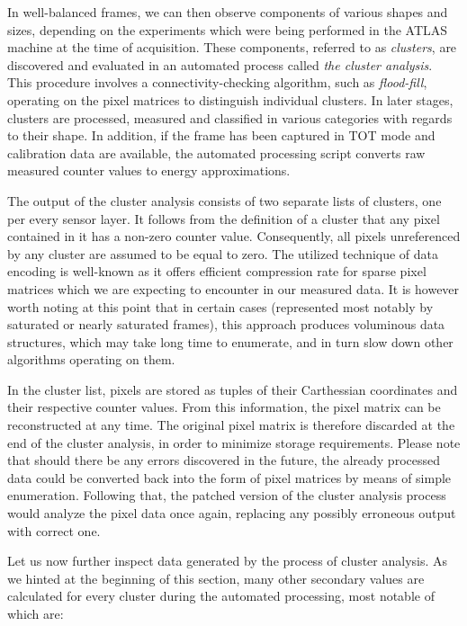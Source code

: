 In well-balanced frames, we can then observe components of various shapes and sizes, depending on the experiments which were being performed in the ATLAS machine at the time of acquisition. These components, referred to as \textit{clusters}, are discovered and evaluated in an automated process called \textit{the cluster analysis}. This procedure involves a connectivity-checking algorithm, such as \textit{flood-fill}, operating on the pixel matrices to distinguish individual clusters. In later stages, clusters are processed, measured and classified in various categories with regards to their shape. In addition, if the frame has been captured in TOT mode and calibration data are available, the automated processing script converts raw measured counter values to energy approximations.


The output of the cluster analysis consists of two separate lists of clusters, one per every sensor layer. It follows from the definition of a cluster that any pixel contained in it has a non-zero counter value. Consequently, all pixels unreferenced by any cluster are assumed to be equal to zero. The utilized technique of data encoding is well-known as it offers efficient compression rate for sparse pixel matrices which we are expecting to encounter in our measured data. It is however worth noting at this point that in certain cases (represented most notably by saturated or nearly saturated frames), this approach produces voluminous data structures, which may take long time to enumerate, and in turn slow down other algorithms operating on them.

In the cluster list, pixels are stored as tuples of their Carthessian coordinates and their respective counter values. From this information, the pixel matrix can be reconstructed at any time. The original pixel matrix is therefore discarded at the end of the cluster analysis, in order to minimize storage requirements. Please note that should there be any errors discovered in the future, the already processed data could be converted back into the form of pixel matrices by means of simple enumeration. Following that, the patched version of the cluster analysis process would analyze the pixel data once again, replacing any possibly erroneous output with correct one.

Let us now further inspect data generated by the process of cluster analysis. As we hinted at the beginning of this section, many other secondary values are calculated for every cluster during the automated processing, most notable of which are:

